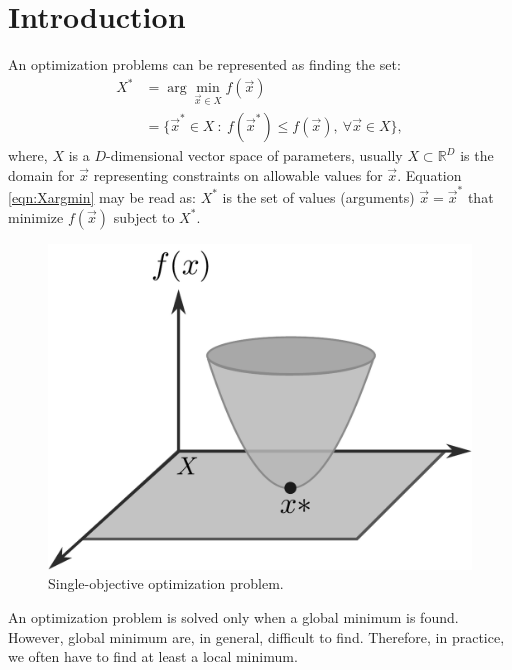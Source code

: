 \documentclass[conference]{IEEEtran}
\begin{document}
\IEEEpeerreviewmaketitle


\section{Introduction}

An optimization problems can be represented as finding the set:
% 
\begin{align}
    X^* &= \arg \min_{\vec{x} \in X} f(\vec{x}) \\
    &= \{ \vec{x}^* \in X \ : \ f(\vec{x}^*) \leq f( \vec{x} ), \ 
    \forall
    \vec{x} \in X \},
    \label{eqn:Xargmin}
\end{align}
% 
where, $X$ is a $D$-dimensional vector space of parameters, usually $X \subset \mathbb{R}^D$
is the domain for $\vec{x}$ representing constraints on allowable values for $\vec{x}$.
Equation \ref{eqn:Xargmin} may be read as: $X^*$ is the set of values (arguments)
$\vec{x} = \vec{x}^*$ that minimize $f(\vec{x})$ subject to $X^*$.

% 
\begin{figure}[!ht]
    \centering
    \includegraphics[width=0.5\linewidth]{img/monolevel.pdf}
    \caption{Single-objective optimization problem.}
    \label{fig:single-level}
\end{figure}

An optimization problem is solved only when a global minimum
is found. However, global minimum are, in general, difficult to find. Therefore,
in practice, we often have to find at least a local minimum.
\end{document}
